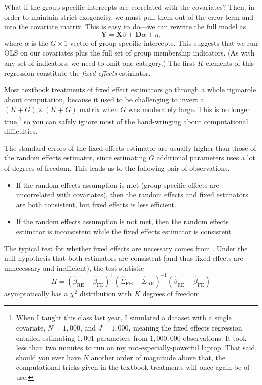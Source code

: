 \documentclass[
  12pt,
  oneside,openany]{book}
\begin{document}
What if the group-specific intercepts are correlated with the covariates? Then, in order to maintain strict exogeneity, we must pull them out of the error term and into the covariate matrix. This is easy to do---we can rewrite the full model as
\[
\mathbf{Y} = \mathbf{X} \beta + \mathbf{D} \alpha + \eta,
\]
where \(\alpha\) is the \(G \times 1\) vector of group-specific intercepts. This suggests that we run OLS on our covariates plus the full set of group membership indicators. (As with any set of indicators, we need to omit one category.) The first \(K\) elements of this regression constitute the \emph{fixed effects} estimator.

Most textbook treatments of fixed effect estimators go through a whole rigmarole about computation, because it used to be challenging to invert a \((K + G) \times (K + G)\) matrix when \(G\) was moderately large. This is no longer true,\footnote{When I taught this class last year, I simulated a dataset with a single covariate, \(N = 1{,}000\), and \(J = 1{,}000\), meaning the fixed effects regression entailed estimating \(1{,}001\) parameters from \(1{,}000{,}000\) observations. It took less than two minutes to run on my not-especially-powerful laptop. That said, should you ever have \(N\) another order of magnitude above that, the computational tricks given in the textbook treatments will once again be of use.} so you can safely ignore most of the hand-wringing about computational difficulties.

The standard errors of the fixed effects estimator are usually higher than those of the random effects estimator, since estimating \(G\) additional parameters uses a lot of degrees of freedom. This leads us to the following pair of observations.

\begin{itemize}
\item
  If the random effects assumption is met (group-specific effects are uncorrelated with covariates), then the random effects and fixed estimators are both consistent, but fixed effects is less efficient.
\item
  If the random effects assumption is not met, then the random effects estimator is inconsistent while the fixed effects estimator is consistent.
\end{itemize}

The typical test for whether fixed effects are necessary comes from \citet{Hausman:1978bi}. Under the null hypothesis that both estimators are consistent (and thus fixed effects are unnecessary and inefficient), the test statistic
\[
H = (\hat{\beta}_{\text{RE}} - \hat{\beta}_{\text{FE}})^\top (\hat{\Sigma}_{\text{FE}} - \hat{\Sigma}_{\text{RE}})^{-1} (\hat{\beta}_{\text{RE}} - \hat{\beta}_{\text{FE}})
\]
asymptotically has a \(\chi^2\) distribution with \(K\) degrees of freedom.
\end{document}
